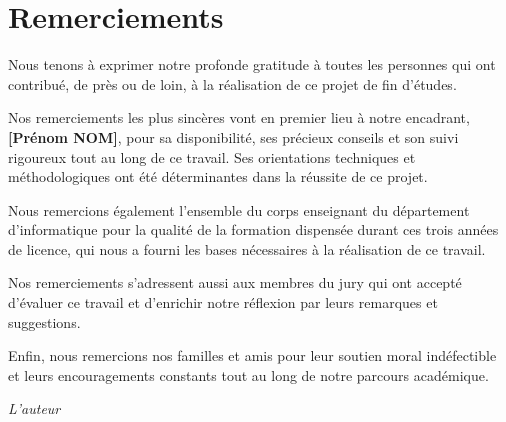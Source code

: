 \chapter*{Remerciements}

\vspace{1cm}

Nous tenons à exprimer notre profonde gratitude à toutes les personnes qui ont contribué, de près ou de loin, à la réalisation de ce projet de fin d'études.

\vspace{0.5cm}

Nos remerciements les plus sincères vont en premier lieu à notre encadrant, \textbf{[Prénom NOM]}, pour sa disponibilité, ses précieux conseils et son suivi rigoureux tout au long de ce travail. Ses orientations techniques et méthodologiques ont été déterminantes dans la réussite de ce projet.

\vspace{0.5cm}

Nous remercions également l'ensemble du corps enseignant du département d'informatique pour la qualité de la formation dispensée durant ces trois années de licence, qui nous a fourni les bases nécessaires à la réalisation de ce travail.

\vspace{0.5cm}

Nos remerciements s'adressent aussi aux membres du jury qui ont accepté d'évaluer ce travail et d'enrichir notre réflexion par leurs remarques et suggestions.

\vspace{0.5cm}

Enfin, nous remercions nos familles et amis pour leur soutien moral indéfectible et leurs encouragements constants tout au long de notre parcours académique.

\vspace{1cm}

\begin{flushright}
\textit{L'auteur}
\end{flushright}
